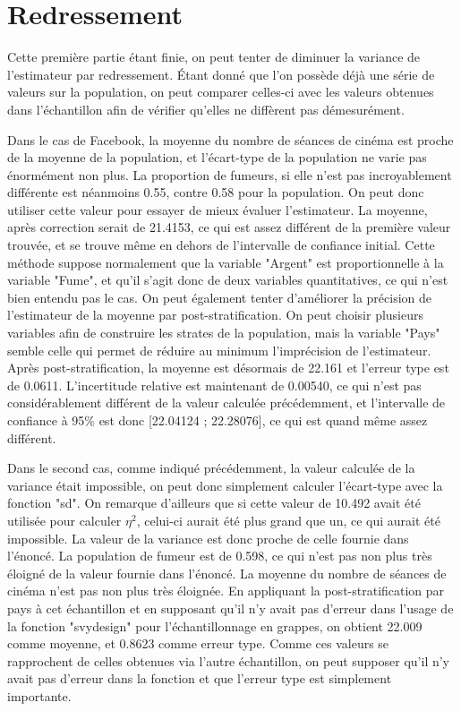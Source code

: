 \documentclass[11pt,a4paper]{report}
\begin{document}
\section*{Redressement}

Cette première partie étant finie, on peut tenter de diminuer la variance de l'estimateur par redressement. Étant donné que l'on possède déjà une série de valeurs sur la population, on peut comparer celles-ci avec les valeurs obtenues dans l'échantillon afin de vérifier qu'elles ne diffèrent pas démesurément.\bigskip

Dans le cas de Facebook, la moyenne du nombre de séances de cinéma est proche de la moyenne de la population, et l'écart-type de la population ne varie pas énormément non plus. La proportion de fumeurs, si elle n'est pas incroyablement différente est néanmoins 0.55, contre 0.58 pour la population. On peut donc utiliser cette valeur pour essayer de mieux évaluer l'estimateur. La moyenne, après correction serait de 21.4153, ce qui est assez différent de la première valeur trouvée, et se trouve même en dehors de l'intervalle de confiance initial. Cette méthode suppose normalement que la variable "Argent" est proportionnelle à la variable "Fume", et qu'il s'agit donc de deux variables quantitatives, ce qui n'est bien entendu pas le cas. On peut également tenter d'améliorer la précision de l'estimateur de la moyenne par post-stratification. On peut choisir plusieurs variables afin de construire les strates de la population, mais la variable "Pays" semble celle qui permet de réduire au minimum l'imprécision de l'estimateur. Après post-stratification, la moyenne est désormais de 22.161 et l'erreur type est de 0.0611. L'incertitude relative est maintenant de 0.00540, ce qui n'est pas considérablement différent de la valeur calculée précédemment, et l'intervalle de confiance à 95\% est donc [22.04124 ; 22.28076], ce qui est quand même assez différent.\bigskip

Dans le second cas, comme indiqué précédemment, la valeur calculée de la variance était impossible, on peut donc simplement calculer l'écart-type avec la fonction "sd". On remarque d'ailleurs que si cette valeur de 10.492 avait été utilisée pour calculer  $\eta^2$, celui-ci aurait été plus grand que un, ce qui aurait été impossible. La valeur de la variance est donc proche de celle fournie dans l'énoncé. La population de fumeur est de 0.598, ce qui n'est pas non plus très éloigné de la valeur fournie dans l'énoncé. La moyenne du nombre de séances de cinéma n'est pas non plus très éloignée. En appliquant la post-stratification par pays à cet échantillon et en supposant qu'il n'y avait pas d'erreur dans l'usage de la fonction "svydesign" pour l'échantillonnage en grappes, on obtient 22.009 comme moyenne, et 0.8623 comme erreur type. Comme ces valeurs se rapprochent de celles obtenues via l'autre échantillon, on peut supposer qu'il n'y avait pas d'erreur dans la fonction et que l'erreur type est simplement importante.\bigskip
\end{document}
